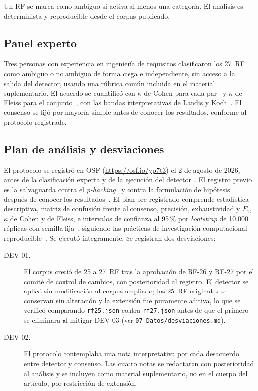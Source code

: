 \documentclass[runningheads]{llncs}
\begin{document}
Un RF se marca como ambiguo si activa al menos una categoría. El análisis es
determinista y reproducible desde el corpus publicado.

\subsection{Panel experto}

Tres personas con experiencia en ingeniería de requisitos clasificaron los
27~RF como ambiguo o no ambiguo de forma ciega e independiente, sin acceso a la
salida del detector, usando una rúbrica común incluida en el material
suplementario. El acuerdo se cuantificó con $\kappa$ de Cohen para cada
par~\cite{cohen1960} y $\kappa$ de Fleiss para el conjunto~\cite{fleiss1971},
con las bandas interpretativas de Landis y Koch~\cite{landis1977}. El consenso
se fijó por mayoría simple antes de conocer los resultados, conforme al
protocolo registrado.

\subsection{Plan de análisis y desviaciones}

El protocolo se registró en OSF (\url{https://osf.io/yp7t3}) el 2 de agosto de
2026, antes de la clasificación experta y de la ejecución del
detector~\cite{nosek2018prereg}. El registro previo es la salvaguarda contra el
\textit{p-hacking}~\cite{simmons2011false} y contra la formulación de hipótesis
después de conocer los resultados~\cite{kerr1998harking}. El plan pre-registrado comprende estadística
descriptiva, matriz de confusión frente al consenso, precisión, exhaustividad y
$F_1$, $\kappa$ de Cohen y de Fleiss, e intervalos de confianza al 95\,\% por
\textit{bootstrap} de 10.000 réplicas con semilla fija~\cite{efron1994},
siguiendo las prácticas de investigación computacional
reproducible~\cite{sandve2013ten,peng2011reproducible}.
Se ejecutó íntegramente. Se registran dos desviaciones:

\begin{description}
\item[DEV-01.] El corpus creció de 25 a 27~RF tras la aprobación de RF-26 y
RF-27 por el comité de control de cambios, con posterioridad al registro. El
detector se aplicó sin modificación al corpus ampliado; los 25~RF originales se
conservan sin alteración y la extensión fue puramente aditiva, lo que se
verificó comparando \texttt{rf25.json} contra \texttt{rf27.json} antes de que
el primero se eliminara al mitigar DEV-03 (ver
\texttt{07\_Datos/desviaciones.md}).
\item[DEV-02.] El protocolo contemplaba una nota interpretativa por cada
desacuerdo entre detector y consenso. Las cuatro notas se redactaron con
posterioridad al análisis y se incluyen como material suplementario, no en el
cuerpo del artículo, por restricción de extensión.
\end{description}
\end{document}
